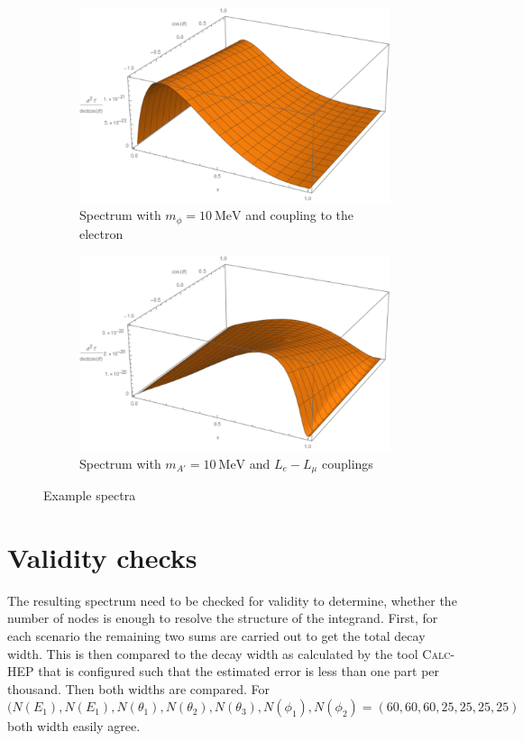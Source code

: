 \begin{figure}[H]
\centering
\begin{subfigure}{.45\textwidth}
  \centering
  \includegraphics[width=\linewidth]{imgs/ScalarElectronPlot}
  \caption{Spectrum with $m_\phi=\SI{10}{\mega \eV}$ and coupling to the electron}
  \label{fg:ScaElSpectrum}
\end{subfigure}%
\begin{subfigure}{.45\textwidth}
  \centering
  \includegraphics[width=\linewidth]{imgs/VectorLeptonPlot}
  \caption{Spectrum with $m_{A'}=\SI{10}{\mega \eV}$ and $L_e-L_\mu$ couplings}
  \label{fg:VecLepSpectrum}
\end{subfigure}
\caption{Example spectra}
\label{fg:exampleSpectra}
\end{figure}
\section{Validity checks}
The resulting spectrum need to be checked for validity to determine, whether the number of nodes is enough to resolve the structure of the integrand. First, for each scenario the remaining two sums are carried out to get the total decay width. This is then compared to the decay width as calculated by the tool \textsc{Calc-HEP} that is configured such that the estimated error is less than one part per thousand. Then both widths are compared. For $(N(E_1),N(E_1),N(\theta_1),N(\theta_2),N(\theta_3),N(\phi_1),N(\phi_2)=(60,60,60,25,25,25,25)$ both width easily agree. 
